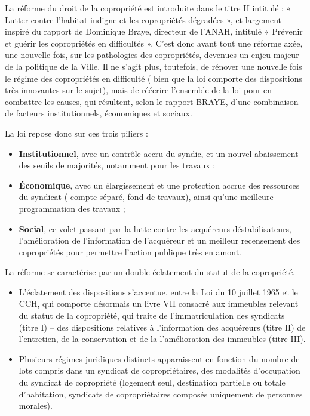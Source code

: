 			La réforme du droit de la copropriété est introduite dans le titre II intitulé : « Lutter contre l’habitat indigne et les copropriétés dégradées », et largement inspiré du rapport de Dominique Braye, directeur de l’ANAH, intitulé « Prévenir et guérir les copropriétés en difficultés ». C’est donc avant tout une réforme axée, une nouvelle fois, sur les pathologies des copropriétés, devenues un enjeu majeur de la politique de la Ville. Il ne s’agit plus, toutefois, de rénover une nouvelle fois le régime des copropriétés en difficulté ( bien que la loi comporte des dispositions très innovantes sur le sujet), mais de réécrire l’ensemble de la loi pour en combattre les causes, qui résultent, selon le rapport BRAYE, d’une combinaison de facteurs institutionnels, économiques et sociaux.
			
			La loi repose donc sur ces trois piliers :
			\begin{itemize}
				\item \textbf{Institutionnel}, avec un contrôle accru du syndic, et un nouvel abaissement des seuils de majorités, notamment pour les travaux ;
				\item \textbf{Économique}, avec un élargissement et une protection accrue des ressources du syndicat ( compte séparé, fond de travaux), ainsi qu’une meilleure programmation des travaux ;
				\item \textbf{Social}, ce volet passant par la lutte contre les acquéreurs déstabilisateurs, l’amélioration de l’information de l’acquéreur et un meilleur recensement des copropriétés pour permettre l’action publique très en amont.
			\end{itemize}
			
			La réforme se caractérise par un double éclatement du statut de la copropriété.
			\begin{itemize}
				\item L’éclatement des dispositions s’accentue, entre la Loi du 10 juillet 1965 et le CCH, qui comporte désormais un livre VII consacré aux immeubles relevant du statut de la copropriété, qui traite de l’immatriculation des syndicats (titre I) – des dispositions	relatives à l’information des acquéreurs (titre II) de l’entretien, de la conservation et de la l’amélioration des immeubles (titre III).
				\item Plusieurs régimes juridiques distincts apparaissent en fonction du nombre de lots compris dans un syndicat de copropriétaires, des modalités d’occupation du syndicat de copropriété (logement seul, destination partielle ou totale d’habitation, syndicats de copropriétaires composés uniquement de personnes morales).
			\end{itemize}
			
